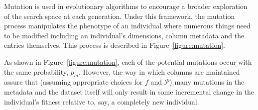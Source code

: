 Mutation is used in evolutionary algorithms to encourage a broader exploration
of the search space at each generation. Under this framework, the mutation
process manipulates the phenotype of an individual where numerous things need to
be modified including an individual's dimensions, column metadata and the
entries themselves. This process is described in Figure~\ref{figure:mutation}.


As shown in Figure~\ref{figure:mutation}, each of the potential mutations occur
with the same probability, \(p_m\). However, the way in which columns are
maintained assure that (assuming appropriate choices for \(f\) and
\(\mathcal{P}\)) many mutations in the metadata and the dataset itself will only
result in some incremental change in the individual's fitness
relative to, say, a completely new individual.



